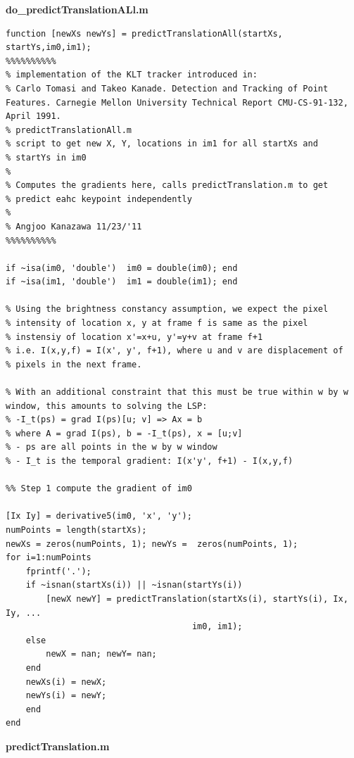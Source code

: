\textbf{do\_predictTranslationALl.m}
\begin{verbatim}
function [newXs newYs] = predictTranslationAll(startXs, startYs,im0,im1);
%%%%%%%%%%
% implementation of the KLT tracker introduced in: 
% Carlo Tomasi and Takeo Kanade. Detection and Tracking of Point Features. Carnegie Mellon University Technical Report CMU-CS-91-132, April 1991.
% predictTranslationAll.m
% script to get new X, Y, locations in im1 for all startXs and
% startYs in im0
%
% Computes the gradients here, calls predictTranslation.m to get
% predict eahc keypoint independently
%
% Angjoo Kanazawa 11/23/'11
%%%%%%%%%%

if ~isa(im0, 'double')  im0 = double(im0); end
if ~isa(im1, 'double')  im1 = double(im1); end

% Using the brightness constancy assumption, we expect the pixel
% intensity of location x, y at frame f is same as the pixel
% instensiy of location x'=x+u, y'=y+v at frame f+1
% i.e. I(x,y,f) = I(x', y', f+1), where u and v are displacement of
% pixels in the next frame.

% With an additional constraint that this must be true within w by w window, this amounts to solving the LSP:
% -I_t(ps) = grad I(ps)[u; v] => Ax = b
% where A = grad I(ps), b = -I_t(ps), x = [u;v]
% - ps are all points in the w by w window
% - I_t is the temporal gradient: I(x'y', f+1) - I(x,y,f)

%% Step 1 compute the gradient of im0 

[Ix Iy] = derivative5(im0, 'x', 'y'); 
numPoints = length(startXs);
newXs = zeros(numPoints, 1); newYs =  zeros(numPoints, 1);
for i=1:numPoints
    fprintf('.');
    if ~isnan(startXs(i)) || ~isnan(startYs(i))
        [newX newY] = predictTranslation(startXs(i), startYs(i), Ix, Iy, ...
                                     im0, im1);
    else
        newX = nan; newY= nan;
    end
    newXs(i) = newX; 
    newYs(i) = newY;
    end
end
\end{verbatim}
\textbf{predictTranslation.m}
